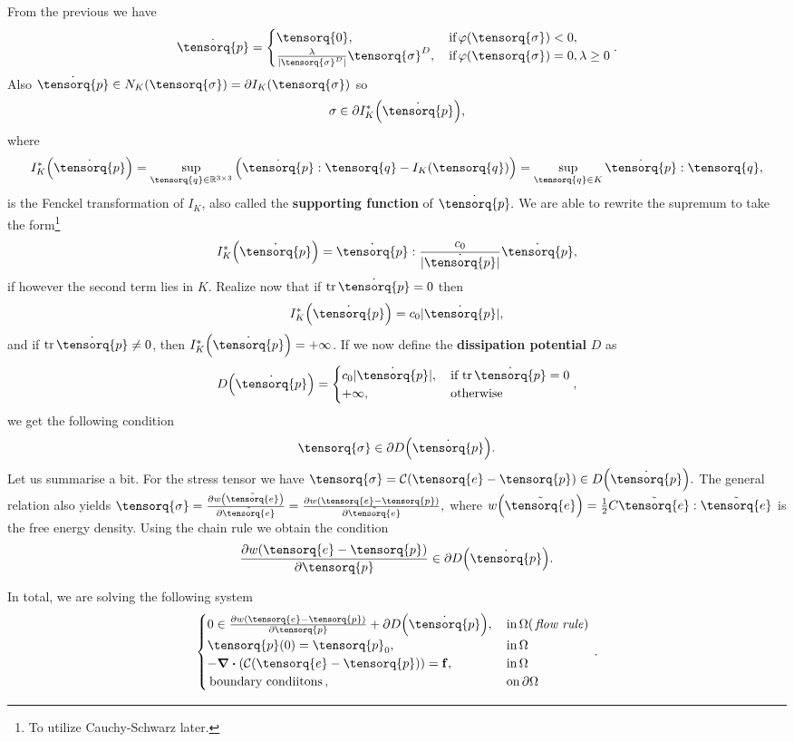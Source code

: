 \documentclass[reqno, a4paper]{article}
\begin{document}
From the previous we have
\[
	\dot{\tensorq{p}} = \begin{cases}
		\tensorq{0}, & \, \text{if} \, \varphi\qty(\tensorq{\sigma})<0, \\
		\frac{\lambda}{|\tensorq{\sigma}^D|}\tensorq{\sigma}^D, & \, \text{if} \, \varphi\qty(\tensorq{\sigma}) = 0, \lambda \geq 0
	\end{cases}.
\]
Also $\dot{\tensorq{p}} \in N_K\qty(\tensorq{\sigma}) = \partial I_K\qty(\tensorq{\sigma})$ so
\[
	\sigma \in \partial I_K^{*}\qty(\dot{\tensorq{p}}),
\]
where
\[
	I_K^{*}\qty(\dot{\tensorq{p}}) = \sup_{\tensorq{q}\in \R^{3 \times 3}}\qty(\dot{\tensorq{p}}: \tensorq{q}- I_K\qty(\tensorq{q})) = \sup_{\tensorq{q}\in K}\dot{\tensorq{p}}: \tensorq{q},
\]
is the Fenckel transformation of $I_K$, also called the \textbf{supporting function} of $\dot{\tensorq{p}}.$ We are able to rewrite the supremum to take the form\footnote{To utilize Cauchy-Schwarz later.}
\[
	I_K^{*}\qty(\dot{\tensorq{p}}) = \dot{\tensorq{p}} : \frac{c_0}{|\dot{\tensorq{p}}|}\dot{\tensorq{p}},
\]
if however the second term lies in $K$. Realize now that if $\tr \dot{\tensorq{p}} = 0$ then
\[
	I_K^{*}\qty(\dot{\tensorq{p}}) = c_0 |\dot{\tensorq{p}}|,
\]
and if $\tr \dot{\tensorq{p}} \neq 0$, then $I_K^{*}\qty(\dot{\tensorq{p}})= + \infty$. If we now define the \textbf{dissipation potential} $D$ as
\[
	D\qty(\dot{\tensorq{p}}) = \begin{cases}
		c_0 |\dot{\tensorq{p}}|, & \, \text{if} \, \tr \dot{\tensorq{p}} = 0 \\
		+ \infty, & \, \text{otherwise} \,
	\end{cases},
\]
we get the following condition
\[
	\tensorq{\sigma} \in \partial D\qty(\dot{\tensorq{p}}).
\]
Let us summarise a bit. For the stress tensor we have $\tensorq{\sigma} = \mathcal{C}\qty(\tensorq{e}-\tensorq{p}) \in D\qty(\dot{\tensorq{p}}).$ The general relation also yields $\tensorq{\sigma}= \pdv{w\qty(\tilde{\tensorq{e}})}{\tilde{\tensorq{e}}} = \pdv{w\qty(\tensorq{e}-\tensorq{p})}{\tilde{\tensorq{e}}}, $ where $w\qty(\tilde{\tensorq{e}}) = \frac{1}{2}C \tilde{\tensorq{e}}: \tilde{\tensorq{e}}$ is the free energy density. Using the chain rule we obtain the condition
\[
	\pdv{w\qty(\tensorq{e}-\tensorq{p})}{\tensorq{p}} \in \partial D\qty(\dot{\tensorq{p}}).
\]

In total, we are solving the following system 
\begin{equation*}
    \begin{cases}
	    0 \in \pdv{w\qty(\tensorq{e}-\tensorq{p})}{\tensorq{p}} + \partial D\qty(\dot{\tensorq{p}}), & \, \text{in} \, \Omega (\, \text{\textit{flow rule}}) \, \\
	    \tensorq{p}(0) = \tensorq{p}_0, & \, \text{in} \, \Omega \\
	    - \divergence{\qty(\mathcal{C}\qty(\tensorq{e}-\tensorq{p}))}= \vb{f}, &\, \text{in} \,\Omega \\
	    \, \text{boundary condiitons} \,, & \, \text{on} \,\partial \Omega
    \end{cases}.
\end{equation*}
\end{document}
